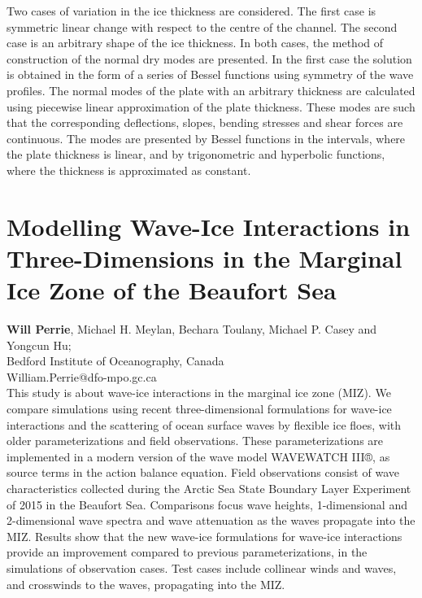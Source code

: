 \documentclass[9pt,a4paper,oneside]{book}
\numberwithin{equation}{section}
\begin{document}
Two cases of variation in the ice thickness are considered. The first case is symmetric linear change with respect to the centre of the channel. The second case is an arbitrary shape of the ice thickness. In both cases, the method of construction of the normal dry modes are presented. In the first case the solution is obtained in the form of a series of Bessel functions using symmetry of the wave profiles. The normal modes of the plate with an arbitrary thickness are calculated using piecewise linear approximation of the plate thickness. These modes are such that the corresponding deflections, slopes, bending stresses and shear forces are continuous. The modes are presented by Bessel functions in the intervals, where the plate thickness is linear, and by trigonometric and hyperbolic functions, where the thickness is approximated as constant.

\section*{Modelling Wave-Ice Interactions in Three-Dimensions in the Marginal Ice Zone of the Beaufort Sea}
 \label{abs:12}
  {\bf Will Perrie}, Michael H. Meylan, Bechara Toulany, Michael P. Casey and Yongcun Hu;\\
Bedford Institute of Oceanography, Canada\\
William.Perrie@dfo-mpo.gc.ca\\

This study is about wave-ice interactions in the marginal ice zone (MIZ). We compare simulations using recent three-dimensional formulations for wave-ice interactions and the scattering of ocean surface waves by flexible ice floes, with older parameterizations and field observations. These parameterizations are implemented in a modern version of the wave model WAVEWATCH III®, as source terms in the action balance equation. Field observations consist of wave characteristics collected during the Arctic Sea State Boundary Layer Experiment of 2015 in the Beaufort Sea. Comparisons focus wave heights, 1-dimensional and 2-dimensional wave spectra and wave attenuation as the waves propagate into the MIZ. Results show that the new wave-ice formulations for wave-ice interactions provide an improvement compared to previous parameterizations, in the simulations of observation cases. Test cases include collinear winds and waves, and crosswinds to the waves, propagating into the MIZ.
\end{document}
